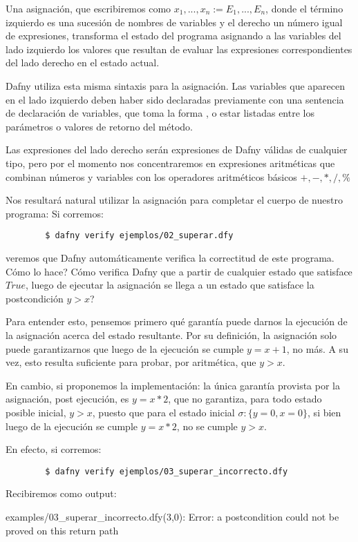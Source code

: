 \documentclass[12pt, a4paper, openany, fleqn]{book}
\begin{document}
    Una asignación, que escribiremos como $x_1,...,x_n := E_1,...,E_n$, donde el término izquierdo es una sucesión de nombres de variables y el derecho un número igual de expresiones, transforma el estado del programa asignando a las variables del lado izquierdo los valores que resultan de evaluar las expresiones correspondientes del lado derecho en el estado actual.

    Dafny utiliza esta misma sintaxis para la asignación. Las variables que aparecen en el lado izquierdo deben haber sido declaradas previamente con una sentencia de declaración de variables, que toma la forma , o estar listadas entre los parámetros o valores de retorno del método.

    Las expresiones del lado derecho serán expresiones de Dafny válidas de cualquier tipo, pero por el momento nos concentraremos en expresiones aritméticas que combinan números y variables con los operadores aritméticos básicos $+,-,*,/,\%$

    Nos resultará natural utilizar la asignación para completar el cuerpo de nuestro programa:
    Si corremos:
    \begin{verbatim}
        $ dafny verify ejemplos/02_superar.dfy
    \end{verbatim}
    veremos que Dafny automáticamente verifica la correctitud de este programa. Cómo lo hace? Cómo verifica Dafny que a partir de cualquier estado que satisface $True$, luego de ejecutar la asignación  se llega a un estado que satisface la postcondición $y > x$?

    Para entender esto, pensemos primero qué garantía puede darnos la ejecución de la asignación acerca del estado resultante. Por su definición, la asignación solo puede garantizarnos que luego de la ejecución se cumple $y = x + 1$, no más. A su vez, esto resulta suficiente para probar, por aritmética, que $y > x$.

    En cambio, si proponemos la implementación:
    la única garantía provista por la asignación, post ejecución, es $y = x * 2$, que no garantiza, para todo estado posible inicial, $y > x$, puesto que para el estado inicial $\sigma:\{y=0,x=0\}$, si bien luego de la ejecución se cumple $y = x * 2 $, no se cumple $y > x$.

    En efecto, si corremos:
    \begin{verbatim}
        $ dafny verify ejemplos/03_superar_incorrecto.dfy
    \end{verbatim}
    Recibiremos como output:
    \begin{spverbatim}
    examples/03_superar_incorrecto.dfy(3,0): Error: a postcondition could not be proved on this return path
    \end{spverbatim}
\end{document}
